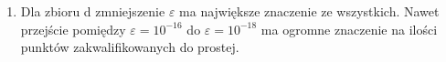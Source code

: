 \begin{enumerate}
\item \quad Dla zbioru d zmniejszenie $\varepsilon$ ma największe znaczenie ze wszystkich. 
Nawet przejście pomiędzy $\varepsilon = 10^{-16}$ do $\varepsilon = 10^{-18}$ ma ogromne znaczenie 
na ilości punktów zakwalifikowanych do prostej.
\end{enumerate}